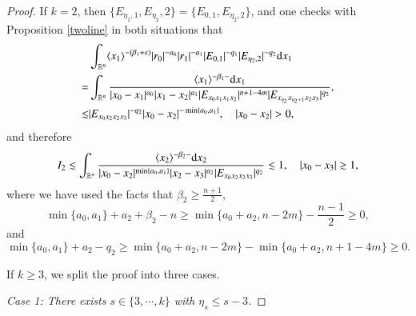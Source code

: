 \documentclass[11pt,reqno]{amsart}
\def\d{{\rm d}}
\numberwithin{equation}{section}
\theoremstyle{definition}
\begin{document}
\begin{proof}
	If $k=2$, then $\{E_{\eta_1,1},E_{\eta_2},2\}=\{E_{0,1},E_{\eta_2,2}\}$, and one checks with Proposition \ref{twoline} in both situations that
	\begin{equation*}\label{I_2}
		\begin{split}
			&\int_{\mathbb{R}^{n}}\langle x_1\rangle^{-(\beta_1+\epsilon)}|r_0|^{-a_0}|r_1|^{-a_1}|E_{0,1}|^{-q_1}|E_{\eta_2,2}|^{-q_2}\d x_1\\
			=&\int_{\mathbb{R}^{n}}\frac{\langle x_1\rangle^{-\beta_1-}\d x_1}{|x_0-x_1|^{a_0}|x_1-x_2|^{a_1}|E_{x_0x_1x_1x_2}|^{n+1-4m}|E_{x_{\eta_2}x_{\eta_2+1}x_2x_3}|^{q_2}},\\
			\lesssim&|E_{x_0x_2x_2x_3}|^{-q_2}|x_0-x_2|^{-\min\{a_0,a_1\}},\quad|x_0-x_2|>0,
		\end{split}
	\end{equation*}
	and therefore
	\begin{equation*}
		I_2\lesssim\int_{\mathbb{R}^n}\frac{\langle x_2\rangle^{-\beta_2-}\d x_2}{|x_0-x_2|^{\min\{a_0,a_1\}}|x_2-x_3|^{a_2}|E_{x_0x_2x_2x_3}|^{q_2}}\lesssim1,\quad|x_0-x_3|\gtrsim1,
	\end{equation*}
	where we have used the facts that $\beta_2\geq\frac{n+1}{2}$,
	\begin{equation*}
		\min\{a_0,a_1\}+a_2+\beta_2-n\geq\min\{a_0+a_2,n-2m\}-\mbox{$\frac{n-1}{2}$}\geq0,
	\end{equation*}
	and
	\begin{equation*}
		\min\{a_0,a_1\}+a_2-q_2\geq\min\{a_0+a_2,n-2m\}-\min\{a_0+a_2,n+1-4m\}\geq0.
	\end{equation*}
	
	If $k\geq3$, we split the proof into three cases.
	
	\noindent\emph{Case 1: There exists $s\in\{3,\cdots,k\}$ with $\eta_s\leq s-3$.}
	

\end{proof}
\end{document}
